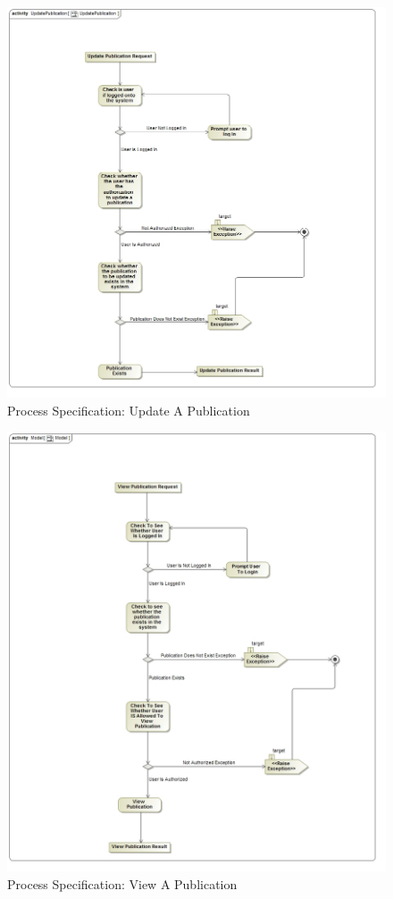 \documentclass[a4paper]{article}
\begin{document}
		\begin{figure}[H]
	    \centering
	    \includegraphics[width=\textwidth]{UpdatePublication.jpg}
	    \caption{Process Specification: Update A Publication}
	\end{figure}
		\begin{figure}[H]
	    \centering
	    \includegraphics[width=\textwidth]{ViewPublication.jpg}
	    \caption{Process Specification: View A Publication}
	\end{figure}
\end{document}
